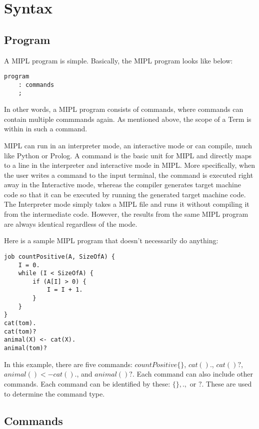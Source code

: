 \documentclass[prodmode,acmtecs]{acmsmall}
\begin{document}
\section{Syntax}

\subsection{Program}

A MIPL program is simple. Basically, the MIPL program looks like below:

\begin{lstlisting}
program
	: commands
	;
\end{lstlisting}

In other words, a MIPL program consists of commands, where commands can contain multiple 
commmands again. As mentioned above, the scope of a Term is within in such a command.

MIPL can run in an interpreter mode, an interactive mode or can compile, much like Python or Prolog. A command
is the basic unit for MIPL and directly maps to a line in the interpreter and interactive mode in MIPL.
More specifically, when the user writes a command to the
input terminal, the command is executed right away in the Interactive mode,
whereas the compiler generates target machine code so that it can be
executed by running the generated target machine code. The Interpreter mode simply takes a MIPL file and runs
it without compiling it from the intermediate code. However, the
results from the same MIPL program are always identical regardless of
the mode.

Here is a sample MIPL program that doesn't necessarily do anything:

\begin{lstlisting}
job countPositive(A, SizeOfA) {
    I = 0.
    while (I < SizeOfA) {
        if (A[I] > 0) {
            I = I + 1.
        }
    }
}
cat(tom).
cat(tom)?
animal(X) <- cat(X).
animal(tom)?
\end{lstlisting}

In this example, there are five commands:
$countPositive\{\}$, $cat().$, $cat()?$, $animal() <- cat().$, and $animal()?$. Each
command can also include other commands. Each command can be identified by these:
$\{\}, .,$ or $?$. These are used to determine the command type.
\medskip

\subsection{Commands}
\end{document}
